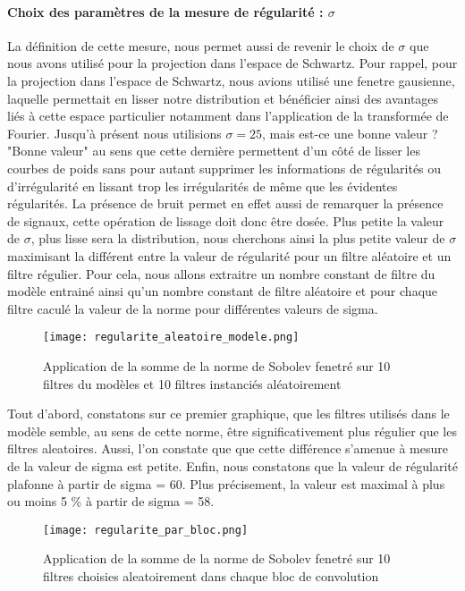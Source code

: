 \documentclass[12pt,a4paper]{article}
\begin{document}
\paragraph{Choix des paramètres de la mesure de régularité : $\sigma$}
La définition de cette mesure, nous permet aussi de revenir le choix de $\sigma$ que nous avons utilisé pour la projection dans l'espace de Schwartz. Pour rappel, pour la projection dans l'espace de Schwartz, nous avions utilisé une fenetre gausienne, laquelle permettait en lisser notre distribution et bénéficier ainsi des avantages liés à cette espace particulier notamment dans l'application de la transformée de Fourier. 
Jusqu'à présent nous utilisions $\sigma = 25$, mais est-ce une bonne valeur ? "Bonne valeur" au sens que cette dernière permettent d'un côté de lisser les courbes de poids sans pour autant supprimer les informations de régularités ou d'irrégularité en lissant trop les irrégularités de même que les évidentes régularités. La présence de bruit permet en effet aussi de remarquer la présence de signaux, cette opération de lissage doit donc être dosée. 
Plus petite la valeur de $\sigma$, plus lisse sera la distribution, nous cherchons ainsi la plus petite valeur de $\sigma$ maximisant la différent entre la valeur de régularité pour un filtre aléatoire et un filtre régulier. 
Pour cela, nous allons extraitre un nombre constant de filtre du modèle entrainé ainsi qu'un nombre constant de filtre aléatoire et pour chaque filtre caculé la valeur de la norme pour différentes valeurs de sigma. 
\begin{figure}[H] %
    \centering    %
    \texttt{[image: regularite\_aleatoire\_modele.png]} %
    \caption{Application de la somme de la norme de Sobolev fenetré sur 10 filtres du modèles et 10 filtres instanciés aléatoirement} %
    \label{fig:mon_image} %
\end{figure}
Tout d'abord, constatons sur ce premier graphique, que les filtres utilisés dans le modèle semble, au sens de cette norme, être significativement plus régulier que les filtres aleatoires. Aussi, l'on constate que que cette différence s'amenue à mesure de la valeur de sigma est petite. Enfin, nous constatons que la valeur de régularité plafonne à partir de sigma = 60. Plus précisement, la valeur est maximal à plus ou moins 5 \% à partir de sigma = 58.  
\begin{figure}[H] %
    \centering    %
    \texttt{[image: regularite\_par\_bloc.png]} %
    \caption{Application de la somme de la norme de Sobolev fenetré sur 10 filtres choisies aleatoirement dans chaque bloc de convolution} %
    \label{fig:mon_image} %
\end{figure}
\end{document}
